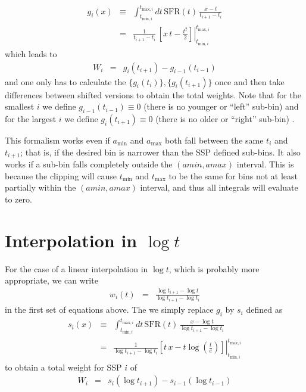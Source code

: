 \documentclass[12pt, letterpaper, preprint]{aastex}
\newcommand{\tmin}[1][]{t_{\mathrm{min} #1}}
\newcommand{\tmax}[1][]{t_{\mathrm{max} #1}}
\newcommand{\amin}{a_{\mathrm{min}}}
\newcommand{\amax} {a_{\mathrm{max}}}
\newcommand{\tintegral}{\int_{\tmin[,i]}^{\tmax[,i]} dt}
\newcommand{\tinterval}{\right|_{\tmin[,i]}^{\tmax[,i]}}
\begin{document}
\begin{eqnarray}
g_i(x) & \equiv & \tintegral \, \mathrm{SFR}(t) \, \frac{x - t}{t_{i+1}  - t_i} \nonumber  \\
 & = & \left. \frac{1}{t_{i+1} - t_i} \, \left[ x\, t - \frac{t^2}{2} \right] \tinterval
\end{eqnarray}
which leads to
\begin{eqnarray}
W_i & = & g_{i}(t_{i+1}) - g_{i-1}(t_{i-1})
\end{eqnarray}
and one only has to calculate the $\{g_i(t_i)\}, \{g_i(t_{i+1})\}$ once and then take differences between shifted versions to obtain the total weights.
Note that for the smallest $i$ we define $g_{i-1}(t_{i-1})\equiv 0$ (there is no younger or ``left'' sub-bin) 
and for the largest $i$ we define $g_{i}(t_{i+1}) \equiv 0$ (there is no older or ``right'' sub-bin) .

This formalism works even if $\amin$ and $\amax$ both fall between the same $t_i$ and $t_{i+1}$; that is, if the desired bin is narrower than the SSP defined sub-bins.
It also works if a sub-bin falls completely outside the $(amin, amax)$ interval.
This is because the clipping will cause $\tmin$ and $\tmax$ to be the same for bins not at least partially within the $(amin, amax)$ interval, and thus all integrals will evaluate to zero.

\section{Interpolation in $\log t$}

For the case of a linear interpolation in $\log t$, which is probably more appropriate, we can write
\begin{eqnarray}
w_{i}(t) & = & \frac{ \log t_{i+1} - \log t}{ \log t_{i+1}  - \log t_i} \nonumber
\end{eqnarray}
in the first set of equations above. The we simply replace $g_i$ by $s_i$ defined as 
\begin{eqnarray}
s_i(x) & \equiv & \tintegral \, \mathrm{SFR}(t) \, \frac{x - \log t}{\log t_{i+1}  - \log t_i} \nonumber \\
 & = & \left. \frac{1}{\log t_{i+1} - \log t_i} \left[ t \, x- t \log\left(\frac{t}{e}\right) \right] \tinterval
\end{eqnarray}
to obtain a total weight for SSP $i$ of
\begin{eqnarray}
W_i & = & s_{i}(\log t_{i+1}) - s_{i-1}(\log t_{i-1}) \nonumber
\end{eqnarray}
\end{document}

